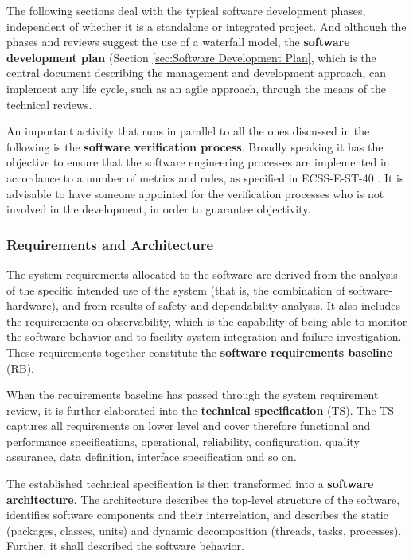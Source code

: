 The following sections deal with the typical software development phases, independent of whether it is a standalone or integrated project. And although the phases and reviews suggest the use of a waterfall model, the \textbf{software development plan} (Section \ref{sec:Software Development Plan}, which is the central document describing the management and development approach, can implement any life cycle, such as an agile approach, through the means of the technical reviews.

An important activity that runs in parallel to all the ones discussed in the following is the \textbf{software verification process}. Broadly speaking it has the objective to ensure that the software engineering processes are implemented in accordance to a number of metrics and rules, as specified in ECSS-E-ST-40 \cite{ECSS-E-ST-40}. It is advisable to have someone appointed for the verification processes who is not involved in the development, in order to guarantee objectivity.

\subsubsection{Requirements and Architecture}

The system requirements allocated to the software are derived from the analysis of the specific intended use of the system (that is, the combination of software-hardware), and from results of safety and dependability analysis. It also includes the requirements on observability, which is the capability of being able to monitor the software behavior and to facility system integration and failure investigation. These requirements together constitute the \textbf{software requirements baseline} (RB).

When the requirements baseline has passed through the system requirement review, it is further elaborated into the \textbf{technical specification} (TS). The TS captures all requirements on lower level and cover therefore functional and performance specifications, operational, reliability, configuration, quality assurance, data definition, interface specification and so on.

The established technical specification is then transformed into a \textbf{software architecture}. The architecture describes the top-level structure of the software, identifies software components and their interrelation, and describes the static (packages, classes, units) and dynamic decomposition (threads, tasks, processes). Further, it shall described the software behavior.

